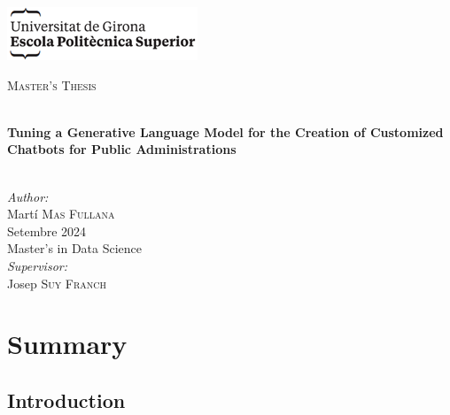 \documentclass[a4paper,12pt,oneside]{ThesisStyle}
\begin{document}
\frontmatter


\hypersetup{pageanchor=false}
\begin{titlepage}

  \includegraphics[scale=0.9]{img/logo_eps.png} \\[1cm]
  \begin{center}
    \textsc{\Large Master's Thesis} \\[1cm]

    \begin{spacing}{2}
      \HRule \\
      \textbf{\Huge Tuning a Generative Language Model for the Creation of Customized Chatbots for Public Administrations} \\
      \HRule \\[0.5cm]
    \end{spacing}

    {
    \large
    \emph{Author:} \\
    Martí \textsc{Mas Fullana} \\[1cm]
    Setembre 2024 \\[1cm]
    Master's in Data Science \\[1cm]
    \emph{Supervisor:} \\
    Josep \textsc{Suy Franch} \\
    }

  \end{center}
\end{titlepage}
\hypersetup{pageanchor=true}

\titlepage



\mainmatter

\chapter{Summary}
\label{cap:summary}

\section{Introduction}
\label{sec:introduction}
\end{document}

